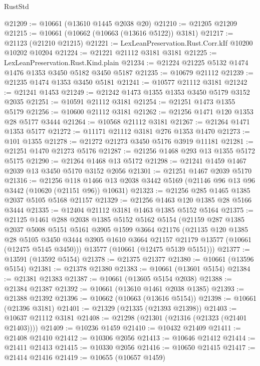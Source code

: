 \begin{lexlean}{RustStd}
\begin{coremodule}
@21209 := @10661 (@13610 @1445 @2038 @20)
@21210 := @21205 @21209
@21215 := @10661 (@10662 (@10663 (@13616 @5122)) @3181)
@21217 := @21123 (@21210 @21215)
@21221 := LexLeanPreservation.Rust.Corr.kIf @10200 @10202 @10204
@21224 := @21221 @21112 @3181 @3181
@21225 := LexLeanPreservation.Rust.Kind.plain
@21234 := @21224 @21225 @5132 @1474 @1476 @1353 @3450 @5182 @3450 @5187
@21235 := @10679 @21112
@21239 := @21235 @1474 @1353 @3450 @5181
@21241 := @10577 @21112 @3181
@21242 := @21241 @1453
@21249 := @21242 @1473 @1355 @1353 @3450 @5179 @3152 @2035
@21251 := @10591 @21112 @3181
@21254 := @21251 @1473 @1355 @5179
@21256 := @10600 @21112 @3181
@21262 := @21256 @1471 @120 @1353 @28 @5177 @3444
@21264 := @10568 @21112 @3181
@21267 := @21264 @1471 @1353 @5177
@21272 := @11171 @21112 @3181 @276 @1353 @1470
@21273 := @101 @1355
@21278 := @21272 @21273 @3450 @5176 @3919 @11181
@21281 := @21251 @1470 @21273 @5176
@21287 := @21256 @1468 @293 @13 @1355 @5172 @5175
@21290 := @21264 @1468 @13 @5172
@21298 := @21241 @1459 @1467 @2039 @13 @3450 @5170 @3152 @2056
@21301 := @21251 @1467 @2039 @5170
@21316 := @21256
    @118
    @1466
    @13
    @2038
    @3442
    @5169
    (@21146 @96 @13 @96 @3442 (@10620 (@21151 @96)) @10631)
@21323 := @21256 @285 @1465 @1385 @2037 @5105 @5168 @21157
@21329 := @21256 @1463 @120 @1385 @28 @5166 @3444
@21335 := @12404 @21112 @3181 @1463 @1385 @5152 @5164
@21375 := @21125
    @1461
    @288
    @2038
    @1385
    @5152
    @5162
    @5154
    (@21159
      @287
      @1385
      @2037
      @5008
      @5151
      @5161
      @3905
      @1599
      @3664
      @21176
      (@21135
        @120
        @1385
        @28
        @5105
        @3450
        @3444
        @3905
        @1610
        @3664
        @21157
        @21179
        @13577
        (@10661 (@12475 @5145 @3450)))
      @13577
      (@10661 (@12475 @5139 @5151)))
@21377 := @13591 (@13592 @5154)
@21378 := @21375 @21377
@21380 := @10661 (@13596 @5154)
@21381 := @21378 @21380
@21383 := @10661 (@13601 @5154)
@21384 := @21381 @21383
@21387 := @10661 (@13605 @5154 @2038)
@21388 := @21384 @21387
@21392 := @10661 (@13610 @1461 @2038 @1385)
@21393 := @21388 @21392
@21396 := @10662 (@10663 (@13616 @5154))
@21398 := @10661 (@21396 @3181)
@21401 := @21329 (@21335 (@21393 @21398))
@21403 := @10637 @21112 @3181
@21408 := @21298 (@21301 (@21316 (@21323 (@21401 @21403))))
@21409 := @10236 @1459
@21410 := @10432 @21409
@21411 := @21408 @21410
@21412 := @10306 @2056
@21413 := @10646 @21412
@21414 := @21411 @21413
@21415 := @10330 @2056
@21416 := @10650 @21415
@21417 := @21414 @21416
@21419 := @10655 (@10657 @1459)

\end{coremodule}
\end{lexlean}
